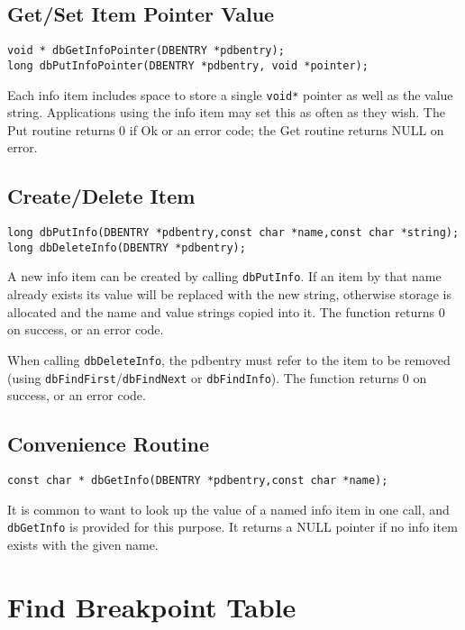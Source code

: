 \subsection{Get/Set Item Pointer Value}

\begin{verbatim}void * dbGetInfoPointer(DBENTRY *pdbentry);
long dbPutInfoPointer(DBENTRY *pdbentry, void *pointer);
\end{verbatim}
Each info item includes space to store a single \verb|void*| pointer as well as the value string. Applications using the info item 
may set this as often as they wish. The Put routine returns 0 if Ok or an error code; the Get routine returns NULL on error.

\subsection{Create/Delete Item}

\begin{verbatim}long dbPutInfo(DBENTRY *pdbentry,const char *name,const char *string);
long dbDeleteInfo(DBENTRY *pdbentry);
\end{verbatim}
A new info item can be created by calling \verb|dbPutInfo|. If an item by that name already exists its value will be replaced 
with the new string, otherwise storage is allocated and the name and value strings copied into it. The function returns 0 on 
success, or an error code.

When calling \verb|dbDeleteInfo|, the pdbentry must refer to the item to be removed (using \verb|dbFindFirst|/\verb|dbFindNext| 
or \verb|dbFindInfo|). The function returns 0 on success, or an error code.

\subsection{Convenience Routine}

\begin{verbatim}const char * dbGetInfo(DBENTRY *pdbentry,const char *name);
\end{verbatim}It is common to want to look up the value of a named info item in one call, and \verb|dbGetInfo| is provided for this purpose. 
It returns a NULL pointer if no info item exists with the given name.

\section{Find Breakpoint Table}


